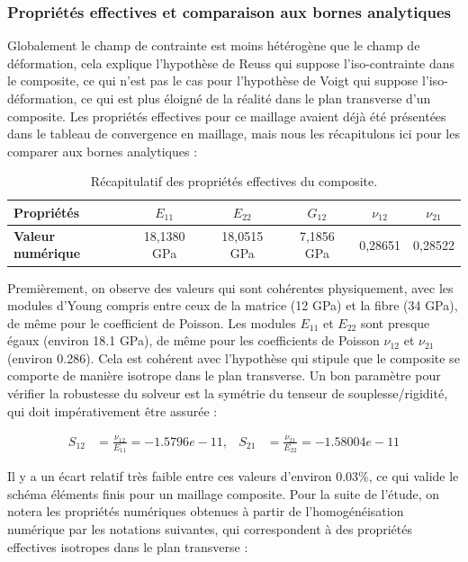 \documentclass[a4paper,11pt]{article}
\begin{document}
\subsubsection{Propriétés effectives et comparaison aux bornes analytiques} 

Globalement le champ de contrainte est moins hétérogène que le champ de déformation, cela explique l'hypothèse de Reuss qui suppose l'iso-contrainte dans le composite, ce qui n'est pas le cas pour l'hypothèse de Voigt qui suppose l'iso-déformation, ce qui est plus éloigné de la réalité dans le plan transverse d'un composite. Les propriétés effectives pour ce maillage avaient déjà été présentées dans le tableau de convergence en maillage, mais nous les récapitulons ici pour les comparer aux bornes analytiques :
\begin{table}[H]
    \centering
    \begin{tabular}{|l|c|c|c|c|c|}
        \hline
        \textbf{Propriétés} & $E_{11}$ & $E_{22}$ & $G_{12}$ & $\nu_{12}$ & $\nu_{21}$ \\
        \hline
        \textbf{Valeur numérique} & 18,1380 GPa & 18,0515 GPa & 7,1856 GPa & 0,28651 & 0,28522 \\
        \hline
    \end{tabular}
    \caption{Récapitulatif des propriétés effectives du composite.}
    \label{tab:homo_recap}
\end{table}

Premièrement, on observe des valeurs qui sont cohérentes physiquement, avec les modules d'Young compris entre ceux de la matrice (12 GPa) et la fibre (34 GPa), de même pour le coefficient de Poisson. Les modules $E_{11}$ et $E_{22}$ sont presque égaux (environ 18.1 GPa), de même pour les coefficients de Poisson $\nu_{12}$ et $\nu_{21}$ (environ 0.286). Cela est cohérent avec l'hypothèse qui stipule que le composite se comporte de manière isotrope dans le plan transverse. Un bon paramètre pour vérifier la robustesse du solveur est la symétrie du tenseur de souplesse/rigidité, qui doit impérativement être assurée :

\begin{align}
    S_{12} &= \frac{\nu_{12}}{E_{11}} = -1.5796e-11 , &  S_{21} &= \frac{\nu_{21}}{E_{22}} = -1.58004e-11
\end{align}

Il y a un écart relatif très faible entre ces valeurs d'environ 0.03\%, ce qui valide le schéma éléments finis pour un maillage composite. Pour la suite de l'étude, on notera les propriétés numériques obtenues à partir de l'homogénéisation numérique par les notations suivantes, qui correspondent à des propriétés effectives isotropes dans le plan transverse :
\end{document}
